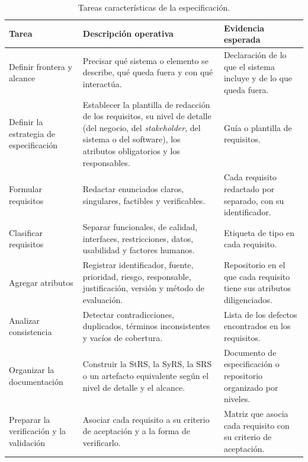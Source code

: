 \documentclass[12pt,letterpaper,oneside]{report}
\begin{document}
\begin{table}[H]
\caption{Tareas características de la especificación.}
\label{tab:tareas_especificacion}
\centering
\footnotesize
\renewcommand{\arraystretch}{1.12}
\begin{tabularx}{\textwidth}{@{}L{4.2cm}Y L{3.4cm}@{}}
\toprule
\textbf{Tarea} & \textbf{Descripción operativa} & \textbf{Evidencia esperada} \\
\midrule
Definir frontera y alcance & Precisar qué sistema o elemento se describe, qué
queda fuera y con qué interactúa. & Declaración de lo que el sistema incluye y
de lo que queda fuera. \\
Definir la estrategia de especificación & Establecer la plantilla de redacción
de los requisitos, su nivel de detalle (del negocio, del \textit{stakeholder},
del sistema o del software), los atributos obligatorios y los responsables. &
Guía o plantilla de requisitos. \\
Formular requisitos & Redactar enunciados claros, singulares, factibles y
verificables. & Cada requisito redactado por separado, con su identificador. \\
Clasificar requisitos & Separar funcionales, de calidad, interfaces,
restricciones, datos, usabilidad y factores humanos. & Etiqueta de tipo en
cada requisito. \\
Agregar atributos & Registrar identificador, fuente, prioridad, riesgo,
responsable, justificación, versión y método de evaluación. & Repositorio en
el que cada requisito tiene sus atributos diligenciados. \\
Analizar consistencia & Detectar contradicciones, duplicados, términos
inconsistentes y vacíos de cobertura. & Lista de los defectos encontrados en
los requisitos. \\
Organizar la documentación & Construir la StRS, la SyRS, la SRS o un artefacto
equivalente según el nivel de detalle y el alcance. & Documento de
especificación o repositorio organizado por niveles. \\
Preparar la verificación y la validación & Asociar cada requisito a su criterio
de aceptación y a la forma de verificarlo. & Matriz que asocia cada requisito
con su criterio de aceptación. \\
\bottomrule
\end{tabularx}
\end{table}
\end{document}
